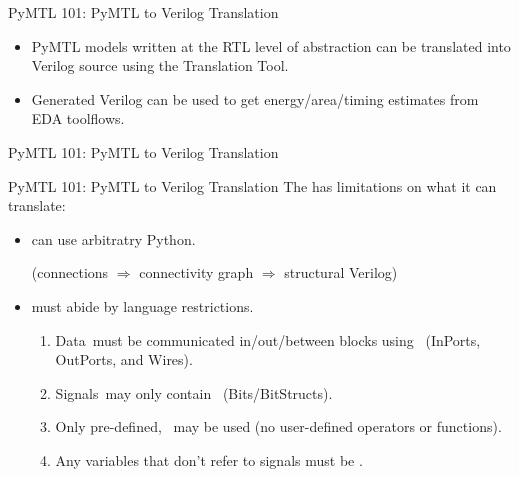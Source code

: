 \begin{frame}{PyMTL 101: PyMTL to Verilog Translation}

\begin{itemize}
  \item PyMTL models written at the RTL level of abstraction can be
        translated into Verilog source using the Translation Tool.
  \smallskip
  \item Generated Verilog can be used to get energy/area/timing estimates
        from EDA toolflows.
\end{itemize}

\vspace{0.3in}


\end{frame}

\begin{frame}{PyMTL 101: PyMTL to Verilog Translation}
\vspace{0.3in}
\end{frame}

\begin{frame}{PyMTL 101: PyMTL to Verilog Translation}
The  has limitations on what it can translate:

\smallskip
\begin{itemize}
  \item {} can use arbitratry Python.

        (connections $\Rightarrow$ connectivity graph $\Rightarrow$
         structural Verilog)

  \smallskip
  \item {} must abide by language restrictions.

  \pause
  \smallskip
  \begin{enumerate}
    \item Data must be communicated in/out/between blocks
          using  (InPorts, OutPorts, and Wires).
    \smallskip
    \item Signals may only contain 
          (Bits/BitStructs).
    \smallskip
    \item Only pre-defined,  may be
          used (no user-defined operators or functions).
    \smallskip
    \item Any variables that don't refer to signals must be .
  \end{enumerate}
\end{itemize}
\end{frame}

